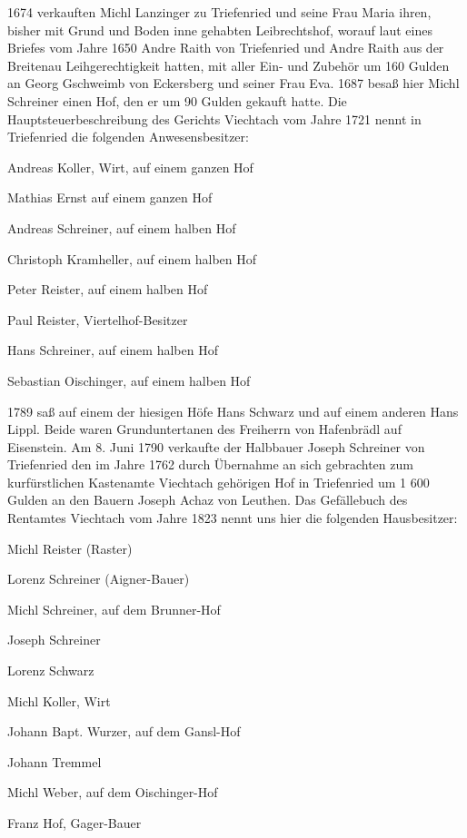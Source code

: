 1674 verkauften Michl Lanzinger zu Triefenried und seine Frau Maria ihren,
bisher mit Grund und Boden inne gehabten Leibrechtshof, worauf laut eines
Briefes vom Jahre 1650 Andre Raith von Triefenried und Andre Raith aus der
Breitenau Leihgerechtigkeit hatten, mit aller Ein- und Zubehör um 160 Gulden an
Georg Gschweimb von Eckersberg und seiner Frau Eva. 1687 besaß hier Michl
Schreiner einen Hof, den er um 90 Gulden gekauft hatte. Die
Hauptsteuerbeschreibung des Gerichts Viechtach vom Jahre 1721 nennt in
Triefenried die folgenden Anwesensbesitzer:



Andreas Koller, Wirt, auf einem ganzen Hof

Mathias Ernst auf einem ganzen Hof

Andreas Schreiner, auf einem halben Hof

Christoph Kramheller, auf einem halben Hof

Peter Reister, auf einem halben Hof

Paul Reister, Viertelhof-Besitzer

Hans Schreiner, auf einem halben Hof

Sebastian Oischinger, auf einem halben Hof



1789 saß auf einem der hiesigen Höfe Hans Schwarz und auf einem anderen Hans
Lippl. Beide waren Grunduntertanen des Freiherrn von Hafenbrädl auf Eisenstein.
Am 8. Juni 1790 verkaufte der Halbbauer Joseph Schreiner von Triefenried den im
Jahre 1762 durch Übernahme an sich gebrachten zum kurfürstlichen Kastenamte
Viechtach gehörigen Hof in Triefenried um 1 600 Gulden an den Bauern Joseph
Achaz von Leuthen. Das Gefällebuch des Rentamtes Viechtach vom Jahre 1823 nennt
uns hier die folgenden Hausbesitzer:



Michl Reister (Raster)

Lorenz Schreiner (Aigner-Bauer)

Michl Schreiner, auf dem Brunner-Hof

Joseph Schreiner

Lorenz Schwarz

Michl Koller, Wirt

Johann Bapt. Wurzer, auf dem Gansl-Hof

Johann Tremmel

Michl Weber, auf dem Oischinger-Hof

Franz Hof, Gager-Bauer



